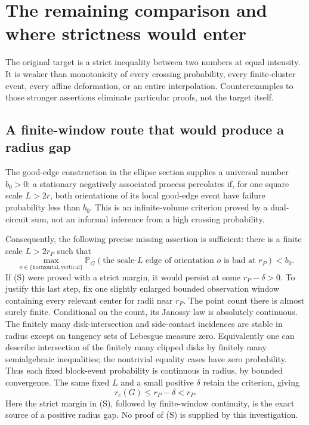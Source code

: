 \documentclass[11pt,a4paper]{article}
\theoremstyle{definition}
\theoremstyle{remark}
\numberwithin{equation}{section}
\begin{document}

\section{The remaining comparison and where strictness would enter}
\label{sec:remaining}

The original target is a strict inequality between two numbers at equal
intensity. It is weaker than monotonicity of every crossing probability,
every finite-cluster event, every affine deformation, or an entire
interpolation. Counterexamples to those stronger assertions eliminate
particular proofs, not the target itself.

\subsection{A finite-window route that would produce a radius gap}
The good-edge construction in the ellipse section supplies a universal
number \(b_0>0\): a stationary negatively associated process percolates
if, for one square scale \(L>2r\), both orientations of its local good-edge
event have failure probability less than \(b_0\). This is an
infinite-volume criterion proved by a dual-circuit sum, not an informal
inference from a high crossing probability.

Consequently, the following precise missing assertion is sufficient:
there is a finite scale \(L>2r_P\) such that
\[
 \max_{o\in\{\mathrm{horizontal},\mathrm{vertical}\}}
 \mathbb P_G(\text{the scale-}L\text{ edge of orientation }o
          \text{ is bad at }r_P)<b_0.
 \tag{S}
\]
If (S) were proved with a strict margin, it would persist at some
\(r_P-\delta>0\). To justify this last step, fix one slightly enlarged
bounded observation window containing every relevant center for radii
near \(r_P\). The point count there is almost surely finite. Conditional
on the count, its Janossy law is absolutely continuous. The finitely many
disk-intersection and side-contact incidences are stable in radius except
on tangency sets of Lebesgue measure zero. Equivalently one can describe
intersection of the finitely many clipped disks by finitely many
semialgebraic inequalities; the nontrivial equality cases have zero
probability. Thus each fixed block-event probability is continuous in
radius, by bounded convergence. The same fixed \(L\) and a small positive
\(\delta\) retain the criterion, giving
\[
                 r_c(G)\le r_P-\delta<r_P.
\]
Here the strict margin in (S), followed by finite-window continuity, is
the exact source of a positive radius gap. No proof of (S) is supplied by
this investigation.
\end{document}
